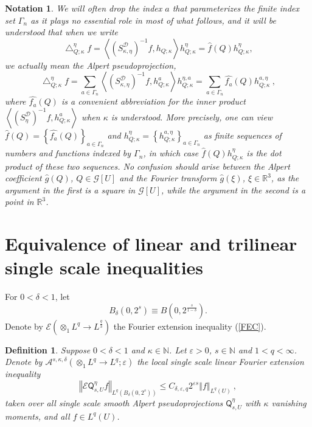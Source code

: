 \documentclass{amsart}%
\theoremstyle{plain}
\newtheorem{definition}[theorem]{Definition}
\newtheorem{notation}[theorem]{Notation}
\numberwithin{equation}{section}
\begin{document}
\begin{notation}
\label{Notation Alpert} We will often drop the index $a$ that parameterizes
the finite index set $\Gamma_{n}$ as it plays no essential role in most of
what follows, and it will be understood that when we write
\[
\bigtriangleup_{Q;\kappa}^{\eta}f=\left\langle \left(  S_{\kappa,\eta
}^{\mathcal{D}}\right)  ^{-1}f,h_{Q;\kappa}\right\rangle h_{Q;\kappa}^{\eta
}=\widehat{f}\left(  Q\right)  h_{Q;\kappa}^{\eta},
\]
we \emph{actually} mean the Alpert \emph{pseudoprojection},%
\[
\bigtriangleup_{Q;\kappa}^{\eta}f=\sum_{a\in\Gamma_{n}}\left\langle \left(
S_{\kappa,\eta}^{\mathcal{D}}\right)  ^{-1}f,h_{Q;\kappa}^{a}\right\rangle
h_{Q;\kappa}^{\eta,a}=\sum_{a\in\Gamma_{n}}\widehat{f_{a}}\left(  Q\right)
h_{Q;\kappa}^{a,\eta}\ ,
\]
where $\widehat{f_{a}}\left(  Q\right)  $ is a convenient abbreviation for the
inner product $\left\langle \left(  S_{\eta}^{\mathcal{D}}\right)
^{-1}f,h_{Q;\kappa}^{a}\right\rangle $ when $\kappa$ is understood. More
precisely, one can view $\widehat{f}\left(  Q\right)  =\left\{  \widehat
{f_{a}}\left(  Q\right)  \right\}  _{a\in\Gamma_{n}}$ and $h_{Q;\kappa}^{\eta
}=\left\{  h_{Q;\kappa}^{a,\eta}\right\}  _{a\in\Gamma_{n}}$ as finite
sequences of numbers and functions indexed by $\Gamma_{n}$, in which case
$\widehat{f}\left(  Q\right)  h_{Q;\kappa}^{\eta}$ is the dot product of these
two sequences. No confusion should arise between the Alpert coefficient
$\widehat{g}\left(  Q\right)  $, $Q\in\mathcal{G}\left[  U\right]  $ and the
Fourier transform $\widehat{g}\left(  \xi\right)  $, $\xi\in\mathbb{R}^{3}$,
as the argument in the first is a square in $\mathcal{G}\left[  U\right]  $,
while the argument in the second is a point in $\mathbb{R}^{3}$.
\end{notation}

\section{Equivalence of linear and trilinear single scale inequalities}

For $0<\delta<1$, let%
\begin{equation}
B_{\delta}\left(  0,2^{s}\right)  \equiv B\left(  0,2^{\frac{s}{1-\delta}%
}\right)  .\label{A delta}%
\end{equation}
Denote by $\mathcal{E}\left(  \otimes_{1}L^{q}\rightarrow L^{\frac{q}{3}%
}\right)  $ the Fourier extension inequality (\ref{FEC}).

\begin{definition}
Suppose $0<\delta<1$ and $\kappa\in\mathbb{N}$. Let $\varepsilon>0$,
$s\in\mathbb{N}$ and $1<q<\infty$. Denote by $\mathcal{A}^{s,\kappa,\delta
}\left(  \otimes_{1}L^{q}\rightarrow L^{q};\varepsilon\right)  $ the
\emph{local single scale} linear Fourier extension inequality%
\[
\left\Vert \mathcal{E}\mathsf{Q}_{s,U}^{\eta}f\right\Vert _{L^{q}\left(
B_{\delta}\left(  0,2^{s}\right)  \right)  }\leq C_{\delta,\varepsilon
,q}2^{\varepsilon s}\left\Vert f\right\Vert _{L^{q}\left(  U\right)  }\ ,
\]
taken over all single scale smooth Alpert pseudoprojections $\mathsf{Q}%
_{s,U}^{\eta}$ with $\kappa$ vanishing moments, and all $f\in L^{q}\left(
U\right)  $.
\end{definition}
\end{document}
